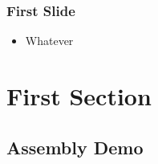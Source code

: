 \documentclass{i20lecture}
\subtitle{LiveDM - PoC}
\begin{document}
\frame{\titlepage}


\begin{frame}
  \frametitle{First Slide}

  \begin{itemize}
    \item Whatever
  \end{itemize}

\end{frame}

\section{First Section}
\subsection{Assembly Demo}
\end{document}
